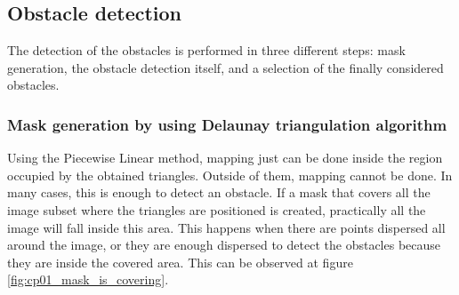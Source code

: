 \subsection{Obstacle detection}\label{ch:chapter01_01_03}

The detection of the obstacles is performed in three different steps: mask generation, the obstacle detection itself, and a selection of the finally considered obstacles.

\subsubsection{Mask generation by using Delaunay triangulation algorithm}\label{ch:chapter01_01_03_01}

Using the Piecewise Linear method, mapping just can be done inside the region occupied by the obtained triangles. Outside of them, mapping cannot be done. In many cases, this is enough to detect an obstacle. If a mask that covers all the image subset where the triangles are positioned is created, practically all the image will fall inside this area. This happens when there are points dispersed all around the image, or they are enough dispersed to detect the obstacles because they are inside the covered area. This can be observed at figure \ref{fig:cp01_mask_is_covering}.

